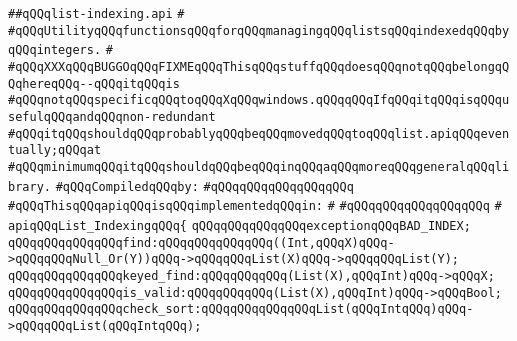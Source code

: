 \label{src/lib/x-kit/widget/old/lib/list-indexing.api}
\verb|##qQQqlist-indexing.api|\newline
\verb|#|\newline
\verb|#qQQqUtilityqQQqfunctionsqQQqforqQQqmanagingqQQqlistsqQQqindexedqQQqbyqQQqintegers.|\newline
\verb|#|\newline
\verb|#qQQqXXXqQQqBUGGOqQQqFIXMEqQQqThisqQQqstuffqQQqdoesqQQqnotqQQqbelongqQQqhereqQQq--qQQqitqQQqis|\newline
\verb|#qQQqnotqQQqspecificqQQqtoqQQqXqQQqwindows.qQQqqQQqIfqQQqitqQQqisqQQqusefulqQQqandqQQqnon-redundant|\newline
\verb|#qQQqitqQQqshouldqQQqprobablyqQQqbeqQQqmovedqQQqtoqQQqlist.apiqQQqeventually;qQQqat|\newline
\verb|#qQQqminimumqQQqitqQQqshouldqQQqbeqQQqinqQQqaqQQqmoreqQQqgeneralqQQqlibrary.|\newline
\newline
\verb|#qQQqCompiledqQQqby:|\newline
\verb|#qQQqqQQqqQQqqQQqqQQq|\newline
\newline
\newline
\verb|#qQQqThisqQQqapiqQQqisqQQqimplementedqQQqin:|\newline
\verb|#|\newline
\verb|#qQQqqQQqqQQqqQQqqQQq|\newline
\verb|#|\newline
\verb|apiqQQqList_IndexingqQQq{|\newline
\newline
\verb|qQQqqQQqqQQqqQQqexceptionqQQqBAD_INDEX;|\newline
\newline
\verb|qQQqqQQqqQQqqQQqfind:qQQqqQQqqQQqqQQq((Int,qQQqX)qQQq->qQQqqQQqNull_Or(Y))qQQq->qQQqqQQqList(X)qQQq->qQQqqQQqList(Y);|\newline
\verb|qQQqqQQqqQQqqQQqkeyed_find:qQQqqQQqqQQq(List(X),qQQqInt)qQQq->qQQqX;|\newline
\newline
\verb|qQQqqQQqqQQqqQQqis_valid:qQQqqQQqqQQq(List(X),qQQqInt)qQQq->qQQqBool;|\newline
\newline
\verb|qQQqqQQqqQQqqQQqcheck_sort:qQQqqQQqqQQqqQQqList(qQQqIntqQQq)qQQq->qQQqqQQqList(qQQqIntqQQq);|\newline
